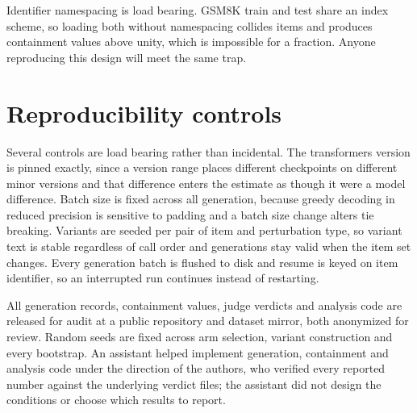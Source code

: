 \documentclass{article}
\begin{document}
Identifier namespacing is load bearing. GSM8K train and test share an index scheme, so
loading both without namespacing collides items and produces containment values above unity,
which is impossible for a fraction. Anyone reproducing this design will meet the same trap.

\section{Reproducibility controls}

Several controls are load bearing rather than incidental. The transformers version is pinned
exactly, since a version range places different checkpoints on different minor versions and
that difference enters the estimate as though it were a model difference. Batch size is fixed
across all generation, because greedy decoding in reduced precision is sensitive to padding
and a batch size change alters tie breaking. Variants are seeded per pair of item and
perturbation type, so variant text is stable regardless of call order and generations stay
valid when the item set changes. Every generation batch is flushed to disk and resume is
keyed on item identifier, so an interrupted run continues instead of restarting.

All generation records, containment values, judge verdicts and analysis code are released for
audit at a public repository and dataset mirror, both anonymized for review. Random seeds are
fixed across arm selection, variant construction and every bootstrap. An assistant helped
implement generation, containment and analysis code under the direction of the authors, who
verified every reported number against the underlying verdict files; the assistant did not
design the conditions or choose which results to report.
\end{document}
